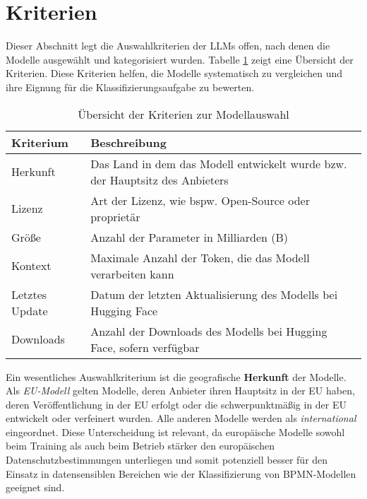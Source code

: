 \section{Kriterien}\label{sec:kriterien}

Dieser Abschnitt legt die Auswahlkriterien der \acp{LLM} offen, nach denen die Modelle ausgewählt und kategorisiert wurden. Tabelle \ref{tab:kriterien} zeigt eine Übersicht der Kriterien. Diese Kriterien helfen, die Modelle systematisch zu vergleichen und ihre Eignung für die Klassifizierungsaufgabe zu bewerten.

\begin{table}[htbp]
    \centering
    \caption{Übersicht der Kriterien zur Modellauswahl}
    \label{tab:kriterien}
    \begin{tabularx}{\textwidth}{p{} p{}}
        \toprule
        \textbf{Kriterium} & \textbf{Beschreibung} \\
        \midrule
        Herkunft & Das Land in dem das Modell entwickelt wurde bzw. der Hauptsitz des Anbieters \\
        Lizenz & Art der Lizenz, wie bspw. Open-Source oder proprietär \\
        Größe & Anzahl der Parameter in Milliarden (B) \\
        Kontext & Maximale Anzahl der Token, die das Modell verarbeiten kann \\
        Letztes Update & Datum der letzten Aktualisierung des Modells bei Hugging Face \cite{huggingface} \\
        Downloads & Anzahl der Downloads des Modells bei Hugging Face, sofern verfügbar \\
        \bottomrule
    \end{tabularx}
\end{table}

Ein wesentliches Auswahlkriterium ist die geografische \textbf{Herkunft} der Modelle. Als \emph{\ac{EU}-Modell} gelten Modelle, deren Anbieter ihren Hauptsitz in der \ac{EU} haben, deren Veröffentlichung in der \ac{EU} erfolgt oder die schwerpunktmäßig in der \ac{EU} entwickelt oder verfeinert wurden. Alle anderen Modelle werden als \emph{international} eingeordnet. Diese Unterscheidung ist relevant, da europäische Modelle sowohl beim Training als auch beim Betrieb stärker den europäischen Datenschutzbestimmungen unterliegen und somit potenziell besser für den Einsatz in datensensiblen Bereichen wie der Klassifizierung von \ac{BPMN}-Modellen geeignet sind.

